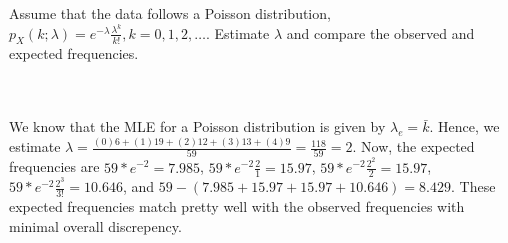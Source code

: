 Assume that the data follows a Poisson distribution,
$p_X(k;\lambda)=e^{-\lambda}\frac{\lambda^k}{k!}, k=0,1,2,\dotsc$. Estimate $\lambda$ and compare the
observed and expected frequencies.\\\\

\begin{solution}\renewcommand{\qedsymbol}{}\ \\
    We know that the MLE for a Poisson distribution is given by $\lambda_e=\bar{k}$. Hence, we estimate
    $\lambda=\frac{(0)6+(1)19+(2)12+(3)13+(4)9}{59}=\frac{118}{59}=2$. Now, the expected frequencies are
    $59*e^{-2}=7.985$, $59*e^{-2}\frac{2}{1}=15.97$, $59*e^{-2}\frac{2^2}{2}=15.97$,
    $59*e^{-2}\frac{2^3}{3!}=10.646$, and $59-(7.985+15.97+15.97+10.646)=8.429$. These expected
    frequencies match pretty well with the observed frequencies with minimal overall discrepency.

\end{solution}
